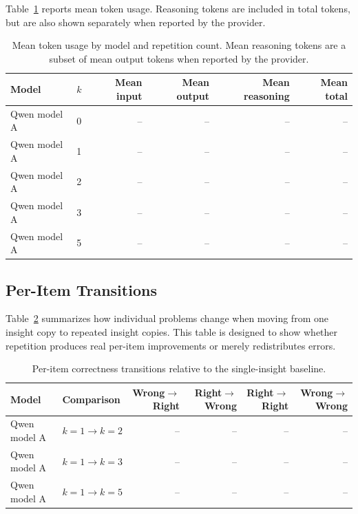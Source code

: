 Table~\ref{tab:token-efficiency} reports mean token usage. Reasoning tokens are included in total tokens, but are also shown separately when reported by the provider.

\begin{table}[t]
    \centering
    \begin{tabular}{llrrrr}
        \hline
        Model & $k$ & Mean input & Mean output & Mean reasoning & Mean total \\
        \hline
        Qwen model A & 0 & -- & -- & -- & -- \\
        Qwen model A & 1 & -- & -- & -- & -- \\
        Qwen model A & 2 & -- & -- & -- & -- \\
        Qwen model A & 3 & -- & -- & -- & -- \\
        Qwen model A & 5 & -- & -- & -- & -- \\
        \hline
    \end{tabular}
    \caption{Mean token usage by model and repetition count. Mean reasoning tokens are a subset of mean output tokens when reported by the provider.}
    \label{tab:token-efficiency}
\end{table}

\subsection{Per-Item Transitions}

Table~\ref{tab:item-transitions} summarizes how individual problems change when moving from one insight copy to repeated insight copies. This table is designed to show whether repetition produces real per-item improvements or merely redistributes errors.

\begin{table}[t]
    \centering
    \begin{tabular}{llrrrr}
        \hline
        Model & Comparison & Wrong$\rightarrow$Right & Right$\rightarrow$Wrong & Right$\rightarrow$Right & Wrong$\rightarrow$Wrong \\
        \hline
        Qwen model A & $k=1 \rightarrow k=2$ & -- & -- & -- & -- \\
        Qwen model A & $k=1 \rightarrow k=3$ & -- & -- & -- & -- \\
        Qwen model A & $k=1 \rightarrow k=5$ & -- & -- & -- & -- \\
        \hline
    \end{tabular}
    \caption{Per-item correctness transitions relative to the single-insight baseline.}
    \label{tab:item-transitions}
\end{table}

